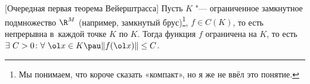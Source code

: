 [Очередная первая теорема Вейерштрасса]
	 Пусть $K$ "--- ограниченное замкнутное подмножество $\R^M$ (например, замкнутый брус)\footnote{Мы понимаем, что короче сказать «компакт», но я же не ввёл это понятие.},
	 $f\in C(K)$, то есть непрерывна в~каждой точке $K$ по $K$.
	 Тогда функция $f$ ограничена на $K$, то есть $\exists\ C>0\colon \forall\ \ol x\in K\pau \|f(\ol x)\|\le C$.
	 